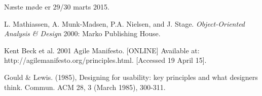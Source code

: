 \documentclass[11pt,a4paper]{report}
\begin{document}
Næste møde er 29/30 marts 2015.

\begin{thebibliography}{1}

 L. Mathiassen, A. Munk-Madsen, P.A. Nielsen, and J. Stage. {\em Object-Oriented Analysis \& Design} 2000: Marko Publishing House.

 Kent Beck et al. 2001 Agile Manifesto. [ONLINE] Available at: http://agilemanifesto.org/principles.html. [Accessed 19 April 15].

 Gould \& Lewis. (1985), Designing for usability: key principles and what designers think. Commun. ACM 28, 3 (March 1985), 300-311.




\end{thebibliography}
\end{document}

